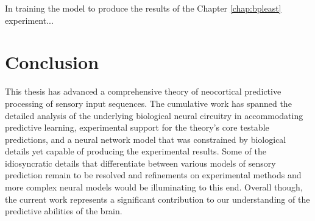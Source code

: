 \documentclass[dwyatte_dissertation.tex]{subfiles}
\begin{document}
In training the model to produce the results of the Chapter \ref{chap:bpleast} experiment...
% 


\section{Conclusion}
This thesis has advanced a comprehensive theory of neocortical predictive processing of sensory input sequences. The cumulative work has spanned the detailed analysis of the underlying biological neural circuitry in accommodating predictive learning, experimental support for the theory's core testable predictions, and a neural network model that was constrained by biological details yet capable of producing the experimental results. Some of the idiosyncratic details that differentiate between various models of sensory prediction remain to be resolved and refinements on experimental methods and more complex neural models would be illuminating to this end. Overall though, the current work represents a significant contribution to our understanding of the predictive abilities of the brain.

%
%
\end{document}
